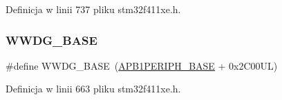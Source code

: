 Definicja w linii 737 pliku stm32f411xe.\+h.

\mbox{\label{group___peripheral__memory__map_ga9a5bf4728ab93dea5b569f5b972cbe62}} 
\subsubsection{\texorpdfstring{W\+W\+D\+G\+\_\+\+B\+A\+SE}{WWDG\_BASE}}
{\footnotesize\ttfamily \#define W\+W\+D\+G\+\_\+\+B\+A\+SE~(\hyperlink{group___peripheral__memory__map_ga45666d911f39addd4c8c0a0ac3388cfb}{A\+P\+B1\+P\+E\+R\+I\+P\+H\+\_\+\+B\+A\+SE} + 0x2\+C00\+U\+L)}



Definicja w linii 663 pliku stm32f411xe.\+h.

